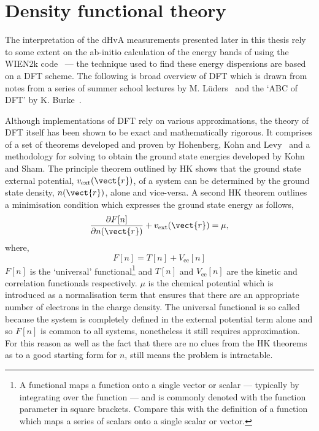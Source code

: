 
\section{Density functional theory}
\label{Sec:Theo:Dft}

The interpretation of the \ac{dHvA} measurements presented later in this thesis rely to some extent on the ab-initio calculation of the energy bands of \BaFeP using the WIEN2k code~\cite{Blaha2001} --- the technique used to find these energy dispersions are based on a \ac{DFT} scheme. The following is broad overview of \ac{DFT} which is drawn from notes from a series of summer school lectures by M. L\"uders~\cite{Luders2010} and the `ABC of DFT' by K. Burke~\cite{Burke2003}.

 Although implementations of \ac{DFT} rely on various approximations, the theory of \ac{DFT} itself has been shown to be exact and mathematically rigorous. It comprises of a set of theorems developed and proven by Hohenberg, Kohn and Levy~\cite{Hohenberg1964, Levy1979} and a methodology for solving to obtain the ground state energies developed by Kohn and Sham. The principle theorem outlined by \ac{HK} shows that the ground state external potential, $v_{\textrm{ext}}(\vect{r})$, of a system can be determined by the ground state density, $n(\vect{r})$, alone and vice-versa. A second \ac{HK} theorem outlines a minimisation condition which expresses the ground state energy as follows,
\begin{equation}
\label{Eqn:Theo:HKMinimisation}
\frac{\partial F[n]}{\partial n(\vect{r})} + v_{\textrm{ext}}(\vect{r}) = \mu,
\end{equation}
where,
\begin{equation}
F[n] = T[n] + V_{\textrm{ee}}[n]
\end{equation}
$F[n]$ is the `universal' functional\footnote{A functional maps a function onto a single vector or scalar --- typically by integrating over the function --- and is commonly denoted with the function parameter in square brackets. Compare this with the definition of a function which maps a series of scalars onto a single scalar or vector.} and $T[n]$ and $V_{\textrm{ee}}[n]$ are the kinetic and correlation functionals respectively. $\mu$ is the chemical potential which is introduced as a normalisation term that ensures that there are an appropriate number of electrons in the charge density. The universal functional is so called because the system is completely defined in the external potential term alone and so $F[n]$ is common to all systems, nonetheless it still requires approximation. For this reason as well as the fact that there are no clues from the \ac{HK} theorems as to a good starting form for $n$, still means the problem is intractable.

